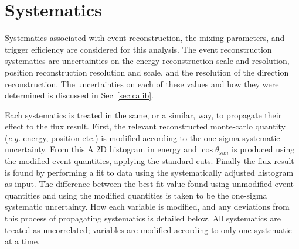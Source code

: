 \section{Systematics}
\label{sec:systematics}
Systematics associated with event reconstruction, the mixing parameters,
and trigger efficiency are considered for this analysis.
The event reconstruction systematics are uncertainties on the energy reconstruction
scale and resolution, position reconstruction resolution and scale, and the
resolution of the direction reconstruction.
The uncertainties on each of these values and how they were determined is
discussed in Sec~\ref{sec:calib}.

Each systematics is treated in the same, or a similar, way, to propagate
their effect to the flux result.
First, the relevant reconstructed monte-carlo quantity (\textit{e.g.} energy, position etc.)
is modified according to the one-sigma systematic uncertainty.
From this A 2D histogram in energy and $\cos\theta_{sun}$ is produced using the
modified event quantities, applying the standard cuts.
Finally the flux result is found by performing a fit to data using the systematically
adjusted histogram as input.
The difference between the best fit value found using unmodified event quantities
and using the modified quantities is taken to be the one-sigma systematic uncertainty.
How each variable is modified, and any deviations from this process of
propagating systematics is detailed below.
All systematics are treated as uncorrelated; variables are modified according to
only one systematic at a time.

